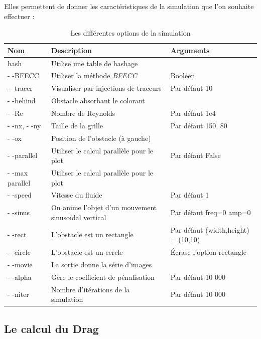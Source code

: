 		Elles permettent de donner les caractéristiques de la simulation que l'on souhaite effectuer :\\
			\begin{table}[htbp]

			\begin{tabular}{|l | p{7cm}| l |}
				\hline
				\textbf{Nom} & \textbf{Description} & \textbf{Arguments}\\
                \hline
				\hline
				\-\-hash & Utilise une table de hashage & \\
				\hline
				- -BFECC & Utiliser la méthode \emph{BFECC} & Booléen\\
				\hline
				- -tracer & Visualiser par injections de traceurs & Par défaut 10\\
				\hline
				- -behind & Obstacle absorbant le colorant & \\
				\hline
				- -Re & Nombre de Reynolds &  Par défaut 1e4\\
				\hline
				- -nx, - -ny & Taille de la grille &  Par défaut 150, 80\\
				\hline
				- -ox & Position de l'obstacle (à gauche) &\\
				\hline
				- -parallel & Utiliser le calcul parallèle pour le plot& Par défaut False\\
				\hline
				- -max parallel & Utiliser le calcul parallèle pour le plot & \\
				\hline
				- -speed & Vitesse du fluide & Par défaut 1 \\
				\hline
				- -sinus & On anime l'objet d'un mouvement sinusoïdal vertical & Par défaut freq=0 amp=0\\
				\hline
				- -rect & L'obstacle est un rectangle & Par défaut (width,height) = (10,10)\\
				\hline
				- -circle & L'obstacle est un cercle & Écrase l'option rectangle\\
				\hline
				- -movie & La sortie donne la série d'images  & \\
				\hline
				- -alpha & Gère le coefficient de pénalisation & Par défaut 10 000\\
				\hline
				- -niter & Nombre d'itérations de la simulation & Par défaut 10 000\\
				\hline
			\end{tabular}
			\caption{Les différentes options de la simulation}	
			\end{table}
			
	\subsection{Le calcul du Drag}
	
